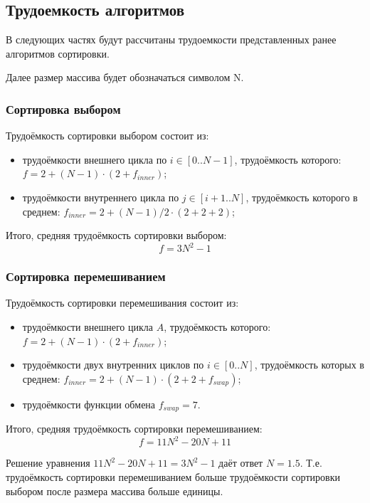 \subsection{Трудоемкость алгоритмов}

В следующих частях будут рассчитаны трудоемкости представленных ранее алгоритмов сортировки.

Далее размер массива будет обозначаться символом N.

\subsubsection{Сортировка выбором}

Трудоёмкость сортировки выбором состоит из:

\begin{itemize}
	\item трудоёмкости внешнего цикла по $i \in [0..N-1]$, трудоёмкость которого: $f = 2 + (N - 1) \cdot (2 + f_{inner})$;
	\item трудоёмкости внутреннего цикла по $j \in [i+1..N]$, трудоёмкость которого в среднем: $f_{inner} = 2 + (N - 1) / 2 \cdot (2 + 2 + 2)$;
\end{itemize}

Итого, средняя трудоёмкость сортировки выбором: 
\begin{equation}
	f = 3N^2 - 1
\end{equation}

\subsubsection{Сортировка перемешиванием}

Трудоёмкость сортировки перемешивания состоит из:

\begin{itemize}
	\item трудоёмкости внешнего цикла $A$, трудоёмкость которого: $f = 2 + (N - 1) \cdot (2 + f_{inner})$;
	\item трудоёмкости двух внутренних циклов по $i \in [0..N]$, трудоёмкость которых в среднем: $f_{inner} = 2 + (N - 1) \cdot (2 + 2 + f_{swap})$;
	\item трудоёмкости функции обмена $f_{swap} = 7$.
\end{itemize}

Итого, средняя трудоёмкость сортировки перемешиванием: 
\begin{equation}
	f = 11N^2 - 20N + 11
\end{equation}

Решение уравнения $11N^2 - 20N + 11 = 3N^2 - 1$ даёт ответ $N = 1.5$.
Т.е. трудоёмкость сортировки перемешиванием больше трудоёмкости сортировки выбором после размера массива больше единицы.
